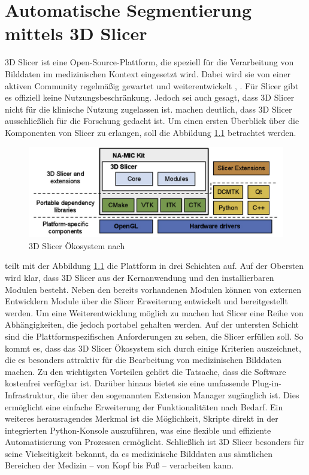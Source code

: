 \chapter{Automatische Segmentierung mittels 3D Slicer}
\label{sec:3d_slicer} 3D Slicer ist eine Open-Source-Plattform, die speziell für
die Verarbeitung von Bilddaten im medizinischen Kontext eingesetzt wird. Dabei wird
sie von einer aktiven Community regelmäßig gewartet und weiterentwickelt \citep[vgl.][]{slicer2024},
\citep[vgl.][S.~1325]{fedorov2012slicer}. Für Slicer gibt es offiziell keine Nutzungsbeschränkung.
Jedoch sei auch gesagt, dass 3D Slicer nicht für die klinische Nutzung zugelassen
ist. \citet[S.~1331]{fedorov2012slicer} machen deutlich, dass 3D Slicer
ausschließlich für die Forschung gedacht ist. Um einen ersten Überblick über die
Komponenten von Slicer zu erlangen, soll die Abbildung
\ref{fig:3d_slicer_oekosystem} betrachtet werden.

\begin{figure}[h]
	\centering
	\includegraphics[width=1\textwidth]{img/3d_slicer_overview.jpg}
	\caption{3D Slicer Ökosystem nach \citet[S.~1326]{fedorov2012slicer}}
	\label{fig:3d_slicer_oekosystem}
\end{figure}

\citet[S.~1326]{fedorov2012slicer} teilt mit der Abbildung
\ref{fig:3d_slicer_oekosystem} die Plattform in drei Schichten auf. Auf der Obersten
wird klar, dass 3D Slicer aus der Kernanwendung und den installierbaren Modulen
besteht. Neben den bereits vorhandenen Modulen können von externen Entwicklern Module
über die Slicer Erweiterung entwickelt und bereitgestellt werden. Um eine
Weiterentwicklung möglich zu machen hat Slicer eine Reihe von Abhängigkeiten, die
jedoch portabel gehalten werden. Auf der untersten Schicht sind die
Plattformspezifischen Anforderungen zu sehen, die Slicer erfüllen soll. So kommt
es, dass das 3D Slicer Ökosystem sich durch einige Kriterien auszeichnet, die es
besonders attraktiv für die Bearbeitung von medizinischen Bilddaten machen. Zu den
wichtigsten Vorteilen gehört die Tatsache, dass die Software kostenfrei
verfügbar ist. Darüber hinaus bietet sie eine umfassende Plug-in-Infrastruktur,
die über den sogenannten Extension Manager zugänglich ist. Dies ermöglicht eine einfache
Erweiterung der Funktionalitäten nach Bedarf. Ein weiteres herausragendes
Merkmal ist die Möglichkeit, Skripte direkt in der integrierten Python-Konsole auszuführen,
was eine flexible und effiziente Automatisierung von Prozessen ermöglicht. Schließlich
ist 3D Slicer besonders für seine Vielseitigkeit bekannt, da es medizinische
Bilddaten aus sämtlichen Bereichen der Medizin – von Kopf bis Fuß – verarbeiten
kann.

